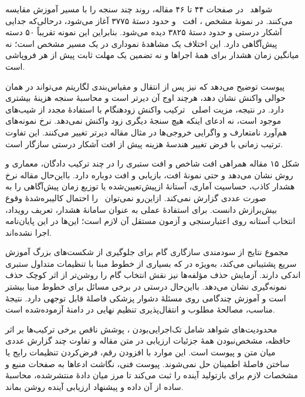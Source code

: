 شواهد \pertalign\ در صفحات ۴۴ تا ۴۶ مقاله، روند چند سنجه را با مسیر آموزش مقایسه می‌کنند. در نمونهٔ مشخص ، افت \pertalign\ و  حدود دستهٔ ۳۷۷۵ آغاز می‌شود، درحالی‌که جدایی آشکار درستی  و  حدود دستهٔ ۳۸۲۵ دیده می‌شود. بنابراین این نمونه تقریباً ۵۰ دسته پیش‌آگاهی دارد. این اختلاف یک مشاهدهٔ نموداری در یک مسیر مشخص است؛ نه میانگین زمان هشدار برای همهٔ اجراها و نه تضمین یک مهلت ثابت پیش از هر فروپاشی است.

پیوست  توضیح می‌دهد که  نیز پس از انتقال و مقیاس‌بندی لگاریتم می‌تواند در همان حوالی واکنش نشان دهد، هرچند اوج آن دیرتر است و محاسبهٔ سنجه هزینهٔ بیشتری دارد. در نتیجه، مزیت اصلی \pertalign\ ترکیب واکنش زودهنگام با استفادهٔ مجدد از شیب‌های موجود است، نه ادعای اینکه هیچ سنجهٔ دیگری زود واکنش نمی‌دهد. نرخ نمونه‌های هم‌آورد نامتعارف و واگرایی خروجی‌ها در مثال مقاله دیرتر تغییر می‌کنند. این تفاوت ترتیب زمانی با فرض تغییر هندسهٔ هزینه پیش از افت آشکار درستی سازگار است.

شکل ۱۵ مقاله همراهی افت شاخص و افت ستبری را در چند ترکیب دادگان، معماری و روش نشان می‌دهد و حتی نمونهٔ افت، بازیابی و افت دوباره دارد. بااین‌حال مقاله نرخ هشدار کاذب، حساسیت آماری، آستانهٔ ازپیش‌تعیین‌شده یا توزیع زمان پیش‌آگاهی را به صورت عددی گزارش نمی‌کند. ازاین‌رو نمی‌توان \pertalign\ را احتمال کالیبره‌شدهٔ وقوع بیش‌برازش دانست. برای استفادهٔ عملی به عنوان سامانهٔ هشدار، تعریف رویداد، انتخاب آستانه روی اعتبارسنجی و آزمون مستقل آن لازم است؛ این‌ها در این پایان‌نامه اجرا نشده‌اند.

مجموع نتایج از سودمندی سازگاری گام برای جلوگیری از شکست‌های بزرگ آموزش سریع پشتیبانی می‌کند، به‌ویژه در  که بسیاری از خطوط مبنا با تنظیمات متداول ستبری اندکی دارند. آزمایش حذف مؤلفه‌ها نیز نقش انتخاب گام را روشن‌تر از اثر کوچک حذف نمونه‌گیری نشان می‌دهد. بااین‌حال درستی  در برخی مسائل برای خطوط مبنا بیشتر است و آموزش چندگامی روی مسئلهٔ دشوار پزشکی فاصلهٔ قابل توجهی دارد. نتیجهٔ مناسب، مصالحهٔ مطلوب و انتقال‌پذیری تنظیم نهایی در دامنهٔ آزموده‌شده است.

محدودیت‌های شواهد شامل تک‌اجرایی‌بودن ، پوشش ناقص برخی ترکیب‌ها بر اثر حافظه، مشخص‌نبودن همهٔ جزئیات ارزیابی در متن مقاله و تفاوت چند گزارش عددی میان متن و پیوست است. این موارد با افزودن رقم، فرض‌کردن تنظیمات رایج یا ساختن فاصلهٔ اطمینان حل نمی‌شوند. پیوست فنی، نگاشت ادعاها به صفحات منبع و مشخصات لازم برای بازتولید آینده را ثبت می‌کند تا مرز میان دادهٔ منتشرشده، محاسبهٔ ساده از آن داده و پیشنهاد ارزیابی آینده روشن بماند.
